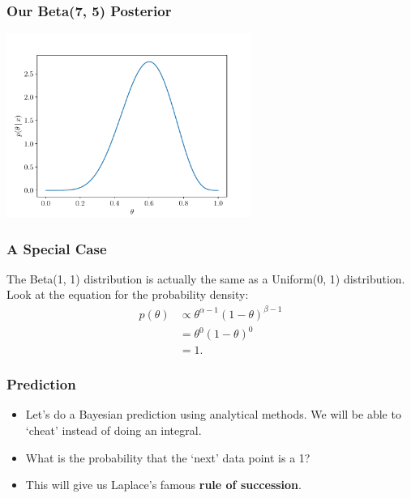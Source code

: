 \documentclass{beamer}
\begin{document}
\begin{frame}
\frametitle{Our Beta(7, 5) Posterior}

\begin{center}
\includegraphics[width=0.6\textwidth]{images/beta_posterior.pdf}
\end{center}

\end{frame}

\begin{frame}
\frametitle{A Special Case}
The Beta(1, 1) distribution is actually the same as a Uniform(0, 1)
distribution. Look at the equation for the probability density:
\begin{align}
p(\theta) &\propto \theta^{\alpha-1}(1-\theta)^{\beta - 1} \\
          &= \theta^{0}(1-\theta)^{0} \\
          &= 1.
\end{align}

\end{frame}



\begin{frame}
\frametitle{Prediction}

\begin{itemize}
\item Let's do a Bayesian prediction using analytical methods. We will be
able to `cheat' instead of doing an integral.\pause
\item What is the probability that the `next' data point is a 1?\pause
\item This will give us Laplace's famous {\bf rule of succession}.
\end{itemize}

\end{frame}
\end{document}
